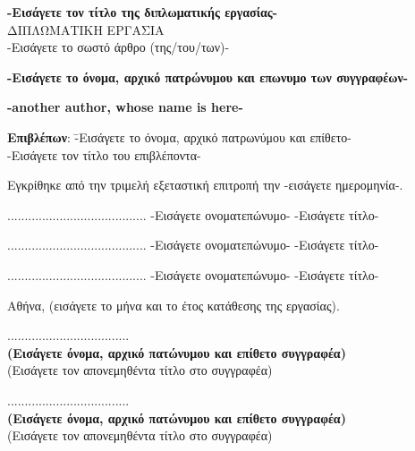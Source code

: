 \documentclass[12pt, twoside, a4paper]{report}
\begin{document}
\begin{center}
\vspace{8ex}
\large \textbf{-Εισάγετε τον τίτλο της διπλωματικής εργασίας-} \\
\vspace{10ex}
\large
ΔΙΠΛΩΜΑΤΙΚΗ ΕΡΓΑΣΙΑ \\
\vspace{2ex}
\normalsize
-Εισάγετε το σωστό άρθρο (της/του/των)- \\
\vspace{2ex}
\parbox[c]{0.4\textwidth} { \center\textbf{
-Εισάγετε το όνομα, αρχικό πατρώνυμου και επωνυμο των συγγραφέων- }}
\parbox[c]{0.4\textwidth} { \center\textbf{
	-another author, whose name is here- }}
\vspace{10ex}
\flushleft
\begin{tabbing}
\textbf{Επιβλέπων}: \= -Εισάγετε το όνομα, αρχικό πατρωνύμου
			και επίθετο- \\
		    \> -Εισάγετε τον τίτλο του επιβλέποντα-
\end{tabbing}
\end{center}

\noindent
Εγκρίθηκε από την τριμελή εξεταστική επιτροπή την -εισάγετε ημερομηνία-.

\begin{center}
\scriptsize
\parbox[b]{0.3\textwidth} {\center
	........................................
	-Εισάγετε ονοματεπώνυμο-
	-Εισάγετε τίτλο-
}
\parbox[b]{0.3\textwidth} {\center
	........................................
	-Εισάγετε ονοματεπώνυμο-
	-Εισάγετε τίτλο-
}
\parbox[b]{0.3\textwidth} {\center
	........................................
	-Εισάγετε ονοματεπώνυμο-
	-Εισάγετε τίτλο-
}
\end{center}
\vspace{10ex}
\normalsize
\noindent
Αθήνα, (εισάγετε το μήνα και το έτος κατάθεσης της εργασίας).
\newpage
\hspace{10pt}

\vspace{30ex}
\noindent
................................... \\
\textbf{(Εισάγετε όνομα, αρχικό πατώνυμου και επίθετο συγγραφέα)} \\
(Εισάγετε τον απονεμηθέντα τίτλο στο συγγραφέα) \\
\vspace{8ex}

\noindent
................................... \\
\textbf{(Εισάγετε όνομα, αρχικό πατώνυμου και επίθετο συγγραφέα)} \\
(Εισάγετε τον απονεμηθέντα τίτλο στο συγγραφέα) \\
\vspace{8ex}
\end{document}
